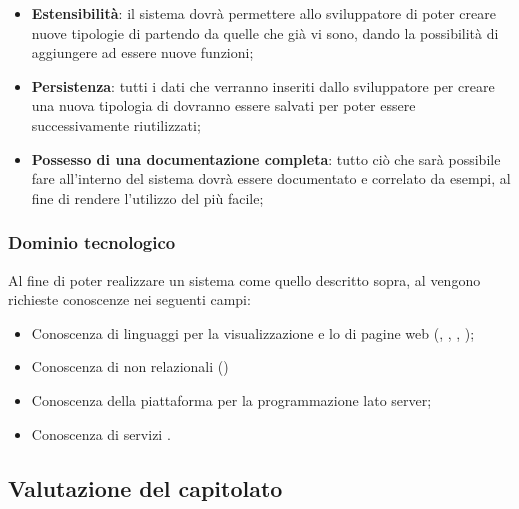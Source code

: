 \begin{itemize}

	\item \textbf{Estensibilità}: il sistema dovrà permettere allo sviluppatore di poter creare nuove tipologie di  partendo da quelle che già vi sono, dando la possibilità di aggiungere ad essere nuove funzioni;

	\item \textbf{Persistenza}: tutti i dati che verranno inseriti dallo sviluppatore per creare una nuova tipologia di  dovranno essere salvati per poter essere successivamente riutilizzati;
	
	\item \textbf{Possesso di una documentazione completa}: tutto ciò che sarà possibile fare all'interno del sistema dovrà essere documentato e correlato da esempi, al fine di rendere l'utilizzo del  più facile;
	
	

\end{itemize}


\subsubsection{Dominio tecnologico} 
Al fine di poter realizzare un sistema come quello descritto sopra, al  vengono richieste conoscenze nei seguenti campi:

\begin{itemize}

	\item Conoscenza di linguaggi per la visualizzazione e lo  di pagine web (, , , );

	\item Conoscenza di  non relazionali ()

	\item Conoscenza della piattaforma  per la programmazione lato server;
	
	\item Conoscenza di servizi .

\end{itemize}


\subsection{Valutazione del capitolato}
